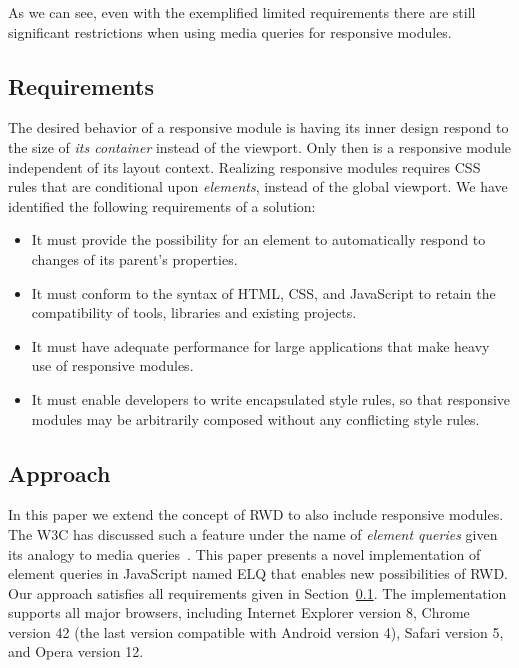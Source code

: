 \documentclass{acm_proc_article-sp}
\newcommand{\elq}{ELQ}
\begin{document}
    As we can see, even with the exemplified limited requirements there are still significant restrictions when using media queries for responsive modules.
    
    \subsection{Requirements}\label{sec:reqs}

      The desired behavior of a responsive module is having its inner design respond to the size of \emph{its container} instead of the viewport.
      Only then is a responsive module independent of its layout context.
      Realizing responsive modules requires CSS rules that are conditional upon \emph{elements}, instead of the global viewport.
      We have identified the following requirements of a solution:

      \begin{itemize}
        \item 
          It must provide the possibility for an element to automatically respond to changes of its parent's properties.
        \item
          It must conform to the syntax of HTML, CSS, and JavaScript to retain the compatibility of tools, libraries and existing projects.
        \item
          It must have adequate performance for large applications that make heavy use of responsive modules.
        \item
          It must enable developers to write encapsulated style rules, so that responsive modules may be arbitrarily composed without any conflicting style rules.
      \end{itemize}

    \subsection{Approach}
      In this paper we extend the concept of RWD to also include responsive modules.
      The W3C has discussed such a feature under the name of \emph{element queries} given its analogy to media queries~\cite{w3c_eq_mail}.
      This paper presents a novel implementation of element queries in JavaScript named \elq{} that enables new possibilities of RWD.
      Our approach satisfies all requirements given in Section~\ref{sec:reqs}.
      The implementation supports all major browsers, including Internet Explorer version 8, Chrome version 42 (the last version compatible with Android version 4), Safari version 5, and Opera version 12.
\end{document}
